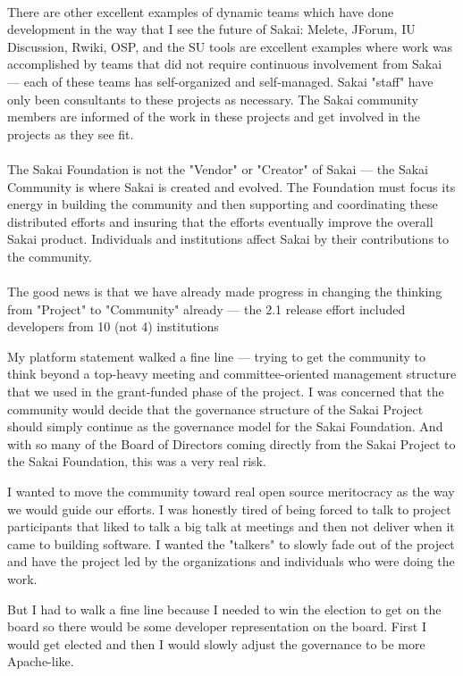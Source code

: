 \documentclass[12pt]{book}
\begin{document}
\begin{sf}
\\
There are other excellent examples of dynamic teams which have done development in the way that I see the future of Sakai: Melete, JForum, IU Discussion, Rwiki, OSP, and the SU tools are excellent examples where work was accomplished by teams that did not require continuous involvement from Sakai --- each of these teams has self-organized and self-managed. Sakai "staff" have only been consultants to these projects as necessary. The Sakai community members are informed of the work in these projects and get involved in the projects as they see fit.\\
\\
The Sakai Foundation is not the "Vendor" or "Creator" of Sakai --- the Sakai Community is where Sakai is created and evolved. The Foundation must focus its energy in building the community and then supporting and coordinating these distributed efforts and insuring that the efforts eventually improve the overall Sakai product. Individuals and institutions affect Sakai by their contributions to the community.\\
\\
The good news is that we have already made progress in changing the thinking from "Project" to "Community" already --- the 2.1 release effort included developers from 10 (not 4) institutions\\
\end{sf}

My platform statement walked a fine line --- trying to get the
community to think beyond a top-heavy
meeting and committee-oriented management structure
that we used in the grant-funded phase of the project.
I was concerned that
the community would decide that the governance structure of the
Sakai Project should simply continue as the governance
model for the Sakai Foundation.
And with so many of the Board of Directors coming
directly from the Sakai Project to the Sakai Foundation, this was a
very real risk.

I wanted to move the community toward real open source
meritocracy as the way we would guide our efforts.  I was
honestly tired of being forced to talk to project participants
that liked to talk a big talk at meetings and then not deliver
when it came to building software.  I wanted the "talkers"
to slowly fade out of the project and have the project led
by the organizations and individuals who were doing the work.

But I had to walk a fine line because I needed to win
the election to get on the board so there would be some
developer representation on the board.  First
I would get elected and then I would slowly adjust the
governance to be more Apache-like.
\end{document}
